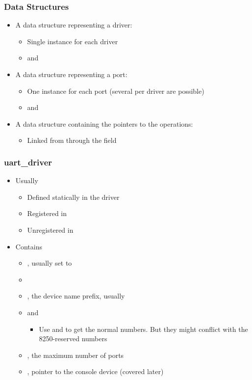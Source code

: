 \begin{frame}
  \frametitle{Data Structures}
  \begin{itemize}
  \item A data structure representing a driver: 
    \begin{itemize}
    \item Single instance for each driver
    \item {} and
    \end{itemize}
  \item A data structure representing a port: 
    \begin{itemize}
    \item One instance for each port (several per driver are possible)
    \item {} and 
    \end{itemize}
  \item A data structure containing the pointers to the operations:
    \begin{itemize}
    \item Linked from  through the  field
    \end{itemize}
  \end{itemize}
\end{frame}

\begin{frame}
  \frametitle{uart\_driver}
  \begin{itemize}
  \item Usually
    \begin{itemize}
    \item Defined statically in the driver
    \item Registered in 
    \item Unregistered in 
    \end{itemize}
  \item Contains
    \begin{itemize}
    \item {}, usually set to 
    \item {}
    \item {}, the device name prefix, usually 
    \item {} and 
      \begin{itemize}
      \item Use  and  to get the normal
        numbers. But they might conflict with the 8250-reserved
        numbers
      \end{itemize}
    \item {}, the maximum number of ports
    \item {}, pointer to the console device (covered later)
    \end{itemize}
  \end{itemize}
\end{frame}

